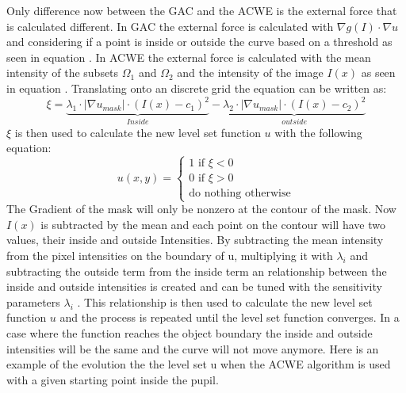 Only difference now between the GAC and the ACWE is the external force that is calculated different. In GAC the external force is calculated with $\nabla g(I) \cdot \nabla u$ and considering if a point is inside or outside the curve based on a threshold as seen in equation . In ACWE the external force is calculated with the mean intensity of the subsets $\Omega_1$ and $\Omega_2$ and the intensity of the image $I(x)$ as seen in equation . Translating onto an discrete grid the equation can be written as: 
\begin{equation}
   \xi  = \underbrace{\lambda_{1} \cdot | \nabla u_{mask}| \cdot (I(x)-c_{1})^{2}}_{Inside}-\underbrace{\lambda_{2} \cdot|\nabla u_{mask}| \cdot (I(x)-c_{2})^{2}}_{outside}
\end{equation} 
$\xi$ is then used to calculate the new level set function $u$ with the following equation:
\begin{equation}
    u(x,y) = \begin{cases}
        1 \text{ if } \xi<0 \\
        0 \text{ if } \xi>0 \\
        \text{do nothing otherwise}
        \end{cases}
\end{equation}
The Gradient of the mask will only be nonzero at the contour of the mask. 
Now $I(x)$ is subtracted by the mean and each point on the contour will have two values, their inside and outside Intensities. By subtracting the mean intensity from the pixel intensities on the boundary of u, multiplying it with $\lambda_i$ and subtracting the outside term from the inside term an relationship between the inside and outside intensities is created and can be tuned with the sensitivity parameters $\lambda_i$ . This relationship is then used to calculate the new level set function $u$ and the process is repeated until the level set function converges. In a case where the function reaches the object boundary the inside and outside intensities will be the same and the curve will not move anymore. 
Here is an example of the evolution the the level set u when the ACWE algorithm is used with a given starting point inside the pupil. 
